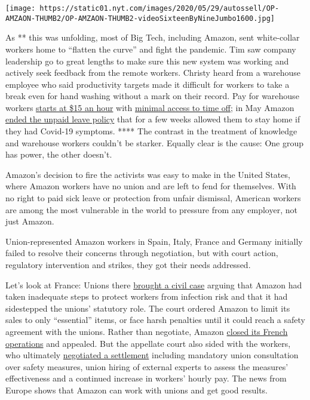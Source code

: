 \texttt{[image: https://static01.nyt.com/images/2020/05/29/autossell/OP-AMZAON-THUMB2/OP-AMZAON-THUMB2-videoSixteenByNineJumbo1600.jpg]}

As ** this was unfolding, most of Big Tech, including Amazon, sent
white-collar workers home to ``flatten the curve'' and fight the
pandemic. Tim saw company leadership go to great lengths to make sure
this new system was working and actively seek feedback from the remote
workers. Christy heard from a warehouse employee who said productivity
targets made it difficult for workers to take a break even for hand
washing without a mark on their record. Pay for warehouse workers
\href{https://www.washingtonpost.com/business/economy/amazons-15-minimum-wage-doesnt-end-debate-over-whether-its-creating-good-jobs/2018/10/05/b1da23a0-c802-11e8-9b1c-a90f1daae309_story.html}{starts
at \$15 an hour} with
\href{https://www.amazon.jobs/en/landing_pages/pto-overview-us}{minimal
access to time off}; in May Amazon
\href{https://www.bloomberg.com/news/articles/2020-04-24/amazon-asks-workers-sheltering-at-home-to-return-or-seek-leave?sref=ExbtjcSG}{ended
the unpaid leave policy} that for a few weeks allowed them to stay home
if they had Covid-19 symptoms. **** The contrast in the treatment of
knowledge and warehouse workers couldn't be starker. Equally clear is
the cause: One group has power, the other doesn't.

Amazon's decision to fire the activists was easy to make in the United
States, where Amazon workers have no union and are left to fend for
themselves. With no right to paid sick leave or protection from unfair
dismissal, American workers are among the most vulnerable in the world
to pressure from any employer, not just Amazon.

Union-represented Amazon workers in Spain, Italy, France and Germany
initially failed to resolve their concerns through negotiation, but with
court action, regulatory intervention and strikes, they got their needs
addressed.

Let's look at France: Unions there
\href{https://www.nytimes.com/2020/04/24/business/amazon-france-unions-coronavirus.html}{brought
a civil case} arguing that Amazon had taken inadequate steps to protect
workers from infection risk and that it had sidestepped the unions'
statutory role. The court ordered Amazon to limit its sales to only
``essential'' items, or face harsh penalties until it could reach a
safety agreement with the unions. Rather than negotiate, Amazon
\href{https://www.nytimes.com/2020/04/15/business/amazon-france-covid.html}{closed
its French operations} and appealed. But the appellate court also sided
with the workers, who ultimately
\href{https://www.nytimes.com/2020/05/16/business/amazon-france-unions-coronavirus.html}{negotiated
a settlement} including mandatory union consultation over safety
measures, union hiring of external experts to assess the measures'
effectiveness and a continued increase in workers' hourly pay. The news
from Europe shows that Amazon can work with unions and get good results.

